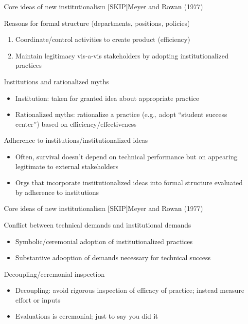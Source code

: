 \begin{frame}{Core ideas of new institutionalism [SKIP]}{Meyer and Rowan (1977)}
	
	Reasons for formal structure (departments, positions, policies)
	\begin{enumerate}
		\item Coordinate/control activities to create product (efficiency)
		\item Maintain legitimacy vis-a-vis stakeholders by adopting institutionalized practices
	\end{enumerate}
	\vspace{2mm}
	Institutions and rationalized myths
	\begin{itemize}
		\item Institution: taken for granted idea about appropriate practice
		\item Rationalized myths: rationalize a practice (e.g., adopt ``student success center'') based on efficiency/effectiveness
	\end{itemize}
	\vspace{2mm}
	Adherence to institutions/institutionalized ideas
	\begin{itemize}
		\item Often, survival doesn't depend on technical performance but on appearing legitimate to external stakeholders
		\item Orgs that incorporate institutionalized ideas into formal structure evaluated by adherence to institutions
	\end{itemize}	

\end{frame}

\begin{frame}{Core ideas of new institutionalism [SKIP]}{Meyer and Rowan (1977)}
	

	Conflict between technical demands and institutional demands
	\begin{itemize}
		\item Symbolic/ceremonial adoption of institutionalized practices
		\item Substantive adooption of demands necessary for technical success
	\end{itemize}
	\vspace{2mm}
	Decoupling/ceremonial inspection
	\begin{itemize}
		\item Decoupling: avoid rigorous inspection of efficacy of practice; instead measure effort or inputs
		\item Evaluations is ceremonial; just to say you did it
	\end{itemize}	

\end{frame}

